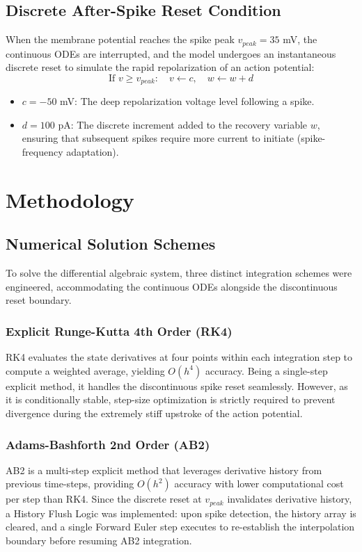 \documentclass[conference]{IEEEtran}
\begin{document}
\subsection{Discrete After-Spike Reset Condition}
When the membrane potential reaches the spike peak $v_{peak} = 35$ mV, the continuous ODEs are interrupted, and the model undergoes an instantaneous discrete reset to simulate the rapid repolarization of an action potential:
\begin{equation}
\text{If } v \ge v_{peak}: \quad v \leftarrow c, \quad w \leftarrow w + d
\end{equation}
\begin{itemize}
    \item $c = -50$ mV: The deep repolarization voltage level following a spike.
    \item $d = 100$ pA: The discrete increment added to the recovery variable $w$, ensuring that subsequent spikes require more current to initiate (spike-frequency adaptation).
\end{itemize}

\section{Methodology}

\subsection{Numerical Solution Schemes}

To solve the differential algebraic system, three distinct integration schemes were engineered, accommodating the continuous ODEs alongside the discontinuous reset boundary.

\subsubsection{Explicit Runge-Kutta 4th Order (RK4)}
RK4 evaluates the state derivatives at four points within each integration step to compute a weighted average, yielding $O(h^4)$ accuracy. Being a single-step explicit method, it handles the discontinuous spike reset seamlessly. However, as it is conditionally stable, step-size optimization is strictly required to prevent divergence during the extremely stiff upstroke of the action potential.

\subsubsection{Adams-Bashforth 2nd Order (AB2)}
AB2 is a multi-step explicit method that leverages derivative history from previous time-steps, providing $O(h^2)$ accuracy with lower computational cost per step than RK4. Since the discrete reset at $v_{peak}$ invalidates derivative history, a History Flush Logic was implemented: upon spike detection, the history array is cleared, and a single Forward Euler step executes to re-establish the interpolation boundary before resuming AB2 integration.
\end{document}
